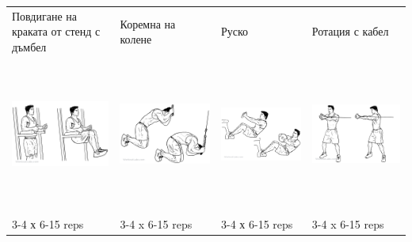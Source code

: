 \documentclass{article}
\begin{document}
\begin{tabular}{ | m{4cm} | m{4cm} | m{4cm} |  m{4cm} | }
\hline
Повдигане на краката от стенд с дъмбел&  Коремна на колене & Руско & Ротация с кабел \\ 
\begin{minipage}{4cm} \includegraphics[width=\linewidth, height=50mm]{Knee_Hip_Raise.png} \end{minipage} & 
\begin{minipage}{4cm} \includegraphics[width=\linewidth, height=50mm]{Kneeling_Cable_Crunch.png} \end{minipage} &
\begin{minipage}{4cm} \includegraphics[width=\linewidth, height=50mm]{Russian_Twist.png} \end{minipage} & 
\begin{minipage}{4cm} \includegraphics[width=\linewidth, height=50mm]{Cable_Core_Rotation.png} \end{minipage} \\
3-4 х 6-15 reps & 3-4 x 6-15 reps & 3-4 х 6-15 reps & 3-4 x 6-15 reps \\ 
\hline
\end{tabular}
\end{document}
